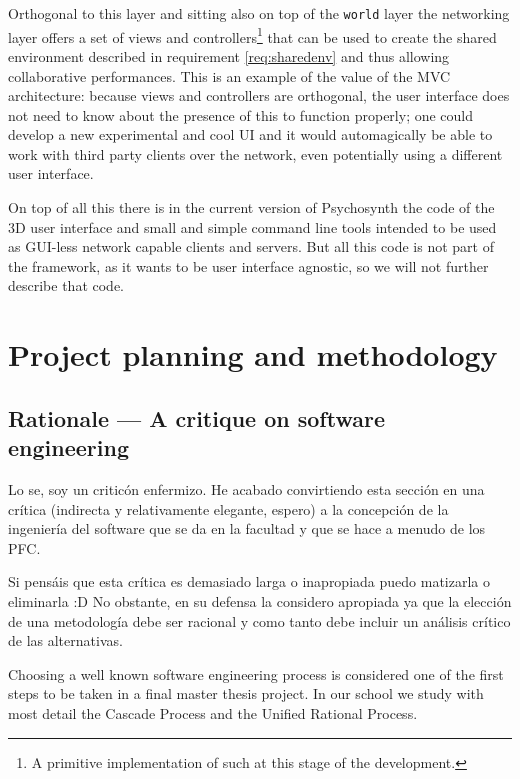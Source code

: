 Orthogonal to this layer and sitting also on top of the \texttt{world}
layer the networking layer offers a set of views and
controllers\footnote{A primitive implementation of such at this stage
  of the development.}  that can be used to create the shared
environment described in requirement \ref{req:sharedenv} and thus
allowing collaborative performances. This is an example of the value
of the MVC architecture: because views and controllers are orthogonal,
the user interface does not need to know about the presence of this to
function properly; one could develop a new experimental and cool UI
and it would automagically be able to work with third party clients
over the network, even potentially using a different user interface.

On top of all this there is in the current version of Psychosynth the
code of the 3D user interface and small and simple command line tools
intended to be used as GUI-less network capable clients and
servers. But all this code is not part of the framework, as it wants
to be user interface agnostic, so we will not further describe that
code.

\section{Project planning and methodology}

\subsection{Rationale --- A critique on software engineering}

\begin{todo}
Lo se, soy un criticón enfermizo. He acabado convirtiendo esta sección
en una crítica (indirecta y relativamente elegante, espero) a la
concepción de la ingeniería del software que se da en la facultad y
que se hace a menudo de los PFC.

Si pensáis que esta crítica es demasiado larga o inapropiada puedo
matizarla o eliminarla :D No obstante, en su defensa la considero
apropiada ya que la elección de una metodología debe ser racional y
como tanto debe incluir un análisis crítico de las alternativas.
\end{todo}

Choosing a well known software engineering process is considered one
of the first steps to be taken in a final master thesis project. In
our school we study with most detail the Cascade Process and the
Unified Rational Process.

